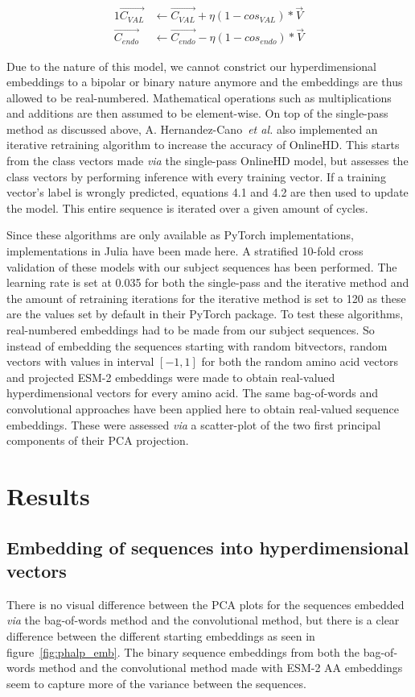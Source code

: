 \begin{alignat}{1}
    \label{eqn:onlinehd2}
    \vec{C_{VAL}} &\leftarrow \vec{C_{VAL}} + \eta (1 - cos_{VAL}) * \vec{V} \\
    \vec{C_{endo}} &\leftarrow \vec{C_{endo}} - \eta (1 - cos_{endo}) * \vec{V}
\end{alignat}

Due to the nature of this model, we cannot constrict our hyperdimensional embeddings to a bipolar or binary nature anymore and the embeddings are thus allowed to be real-numbered. Mathematical operations such as multiplications and additions are then assumed to be element-wise. On top of the single-pass method as discussed above, A. Hernandez-Cano~\textit{et al.} also implemented an iterative retraining algorithm to increase the accuracy of OnlineHD. This starts from the class vectors made \textit{via} the single-pass OnlineHD model, but assesses the class vectors by performing inference with every training vector. If a training vector's label is wrongly predicted, equations 4.1 and 4.2 are then used to update the model. This entire sequence is iterated over a given amount of cycles.

Since these algorithms are only available as PyTorch implementations, implementations in Julia have been made here. A stratified 10-fold cross validation of these models with our subject sequences has been performed. The learning rate is set at 0.035 for both the single-pass and the iterative method and the amount of retraining iterations for the iterative method is set to 120 as these are the values set by default in their PyTorch package. To test these algorithms, real-numbered embeddings had to be made from our subject sequences. So instead of embedding the sequences starting with random bitvectors, random vectors with values in interval $[-1, 1]$ for both the random amino acid vectors and projected ESM-2 embeddings were made to obtain real-valued hyperdimensional vectors for every amino acid. The same bag-of-words and convolutional approaches have been applied here to obtain real-valued sequence embeddings. These were assessed \textit{via} a scatter-plot of the two first principal components of their PCA projection.

\section{Results}
\subsection*{Embedding of sequences into hyperdimensional vectors}
There is no visual difference between the PCA plots for the sequences embedded \textit{via} the bag-of-words method and the convolutional method, but there is a clear difference between the different starting embeddings as seen in figure~\ref{fig:phalp_emb}. The binary sequence embeddings from both the bag-of-words method and the convolutional method made with ESM-2 AA embeddings seem to capture more of the variance between the sequences.

